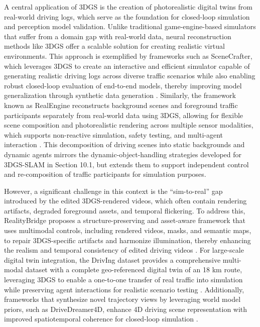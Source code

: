 \documentclass[11pt]{article}
\begin{document}
A central application of 3DGS is the creation of photorealistic digital twins from real-world driving logs, which serve as the foundation for closed-loop simulation and perception model validation. Unlike traditional game-engine-based simulators that suffer from a domain gap with real-world data, neural reconstruction methods like 3DGS offer a scalable solution for creating realistic virtual environments. This approach is exemplified by frameworks such as SceneCrafter, which leverages 3DGS to create an interactive and efficient simulator capable of generating realistic driving logs across diverse traffic scenarios while also enabling robust closed-loop evaluation of end-to-end models, thereby improving model generalization through synthetic data generation \cite{ref659}. Similarly, the framework known as RealEngine reconstructs background scenes and foreground traffic participants separately from real-world data using 3DGS, allowing for flexible scene composition and photorealistic rendering across multiple sensor modalities, which supports non-reactive simulation, safety testing, and multi-agent interaction \cite{ref660}. This decomposition of driving scenes into static backgrounds and dynamic agents mirrors the dynamic-object-handling strategies developed for 3DGS-SLAM in Section 10.1, but extends them to support independent control and re-composition of traffic participants for simulation purposes.

However, a significant challenge in this context is the ``sim-to-real'' gap introduced by the edited 3DGS-rendered videos, which often contain rendering artifacts, degraded foreground assets, and temporal flickering. To address this, RealityBridge proposes a structure-preserving and asset-aware framework that uses multimodal controls, including rendered videos, masks, and semantic maps, to repair 3DGS-specific artifacts and harmonize illumination, thereby enhancing the realism and temporal consistency of edited driving videos \cite{ref661}. For large-scale digital twin integration, the DrivIng dataset provides a comprehensive multi-modal dataset with a complete geo-referenced digital twin of an 18 km route, leveraging 3DGS to enable a one-to-one transfer of real traffic into simulation while preserving agent interactions for realistic scenario testing \cite{ref662}. Additionally, frameworks that synthesize novel trajectory views by leveraging world model priors, such as DriveDreamer4D, enhance 4D driving scene representation with improved spatiotemporal coherence for closed-loop simulation \cite{ref663}.
\end{document}
